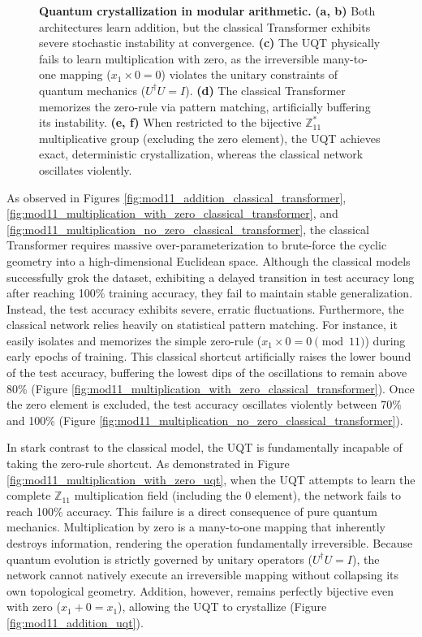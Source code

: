 \documentclass[11pt, a4paper]{article}
\begin{document}
\begin{figure}[tb!]
    \caption{\textbf{Quantum crystallization in modular arithmetic.} \textbf{(a, b)} Both architectures learn addition, but the classical Transformer exhibits severe stochastic instability at convergence. \textbf{(c)} The UQT physically fails to learn multiplication with zero, as the irreversible many-to-one mapping ($x_1 \times 0 = 0$) violates the unitary constraints of quantum mechanics ($U^\dagger U = I$). \textbf{(d)} The classical Transformer memorizes the zero-rule via pattern matching, artificially buffering its instability. \textbf{(e, f)} When restricted to the bijective $\mathbb{Z}_{11}^*$ multiplicative group (excluding the zero element), the UQT achieves exact, deterministic crystallization, whereas the classical network oscillates violently.}
    \label{fig:mod11_plots}
\end{figure}


As observed in Figures \ref{fig:mod11_addition_classical_transformer}, \ref{fig:mod11_multiplication_with_zero_classical_transformer}, and \ref{fig:mod11_multiplication_no_zero_classical_transformer}, the classical Transformer requires massive over-parameterization to brute-force the cyclic geometry into a high-dimensional Euclidean space. Although the classical models successfully grok the dataset, exhibiting a delayed transition in test accuracy long after reaching 100\% training accuracy, they fail to maintain stable generalization. Instead, the test accuracy exhibits severe, erratic fluctuations. Furthermore, the classical network relies heavily on statistical pattern matching. For instance, it easily isolates and memorizes the simple zero-rule ($x_1 \times 0 = 0 \pmod{11}$) during early epochs of training. This classical shortcut artificially raises the lower bound of the test accuracy, buffering the lowest dips of the oscillations to remain above 80\% (Figure \ref{fig:mod11_multiplication_with_zero_classical_transformer}). Once the zero element is excluded, the test accuracy oscillates violently between 70\% and 100\% (Figure \ref{fig:mod11_multiplication_no_zero_classical_transformer}).


In stark contrast to the classical model, the UQT is fundamentally incapable of taking the zero-rule shortcut. As demonstrated in Figure \ref{fig:mod11_multiplication_with_zero_uqt}, when the UQT attempts to learn the complete $\mathbb{Z}_{11}$ multiplication field (including the $0$ element), the network fails to reach 100\% accuracy. This failure is a direct consequence of pure quantum mechanics. Multiplication by zero is a many-to-one mapping that inherently destroys information, rendering the operation fundamentally irreversible. Because quantum evolution is strictly governed by unitary operators ($U^\dagger U = I$), the network cannot natively execute an irreversible mapping without collapsing its own topological geometry. Addition, however, remains perfectly bijective even with zero ($x_1 + 0 = x_1$), allowing the UQT to crystallize (Figure \ref{fig:mod11_addition_uqt}).
\end{document}
